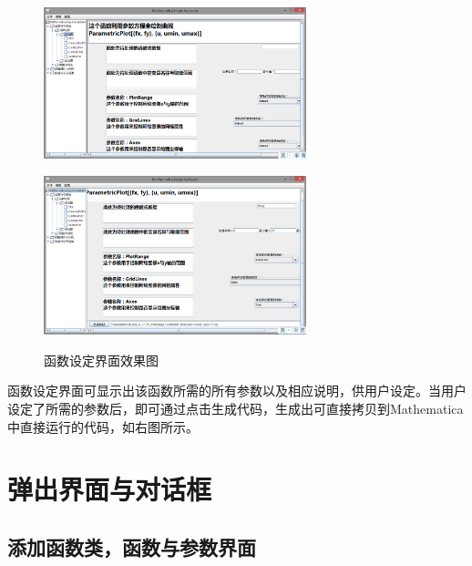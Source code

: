 \documentclass[hyperref, UTF8
,bookmarksnumbered=true, oneside]{ctexbook}
\begin{document}
		\begin{figure}[!h]
			\begin{minipage}[b]{0.45\textwidth}
			\centering
			\includegraphics[width=3in]{Right2.png}
			\label{pic:MathPack}
			\end{minipage}%
			\hspace{0.1\textwidth}%
			\begin{minipage}[b]{0.45\textwidth}
			\centering
			\includegraphics[width=3in]{Right3.png}
			\label{pic:GUIPack}
			\end{minipage}
			\caption{函数设定界面效果图}
		\end{figure}

		函数设定界面可显示出该函数所需的所有参数以及相应说明，供用户设定。当用户设定了所需的参数后，即可通过点击生成代码，生成出可直接拷贝到Mathematica中直接运行的代码，如右图所示。

		

	\section{弹出界面与对话框} %
		
		\subsection{添加函数类，函数与参数界面} %
\end{document}
